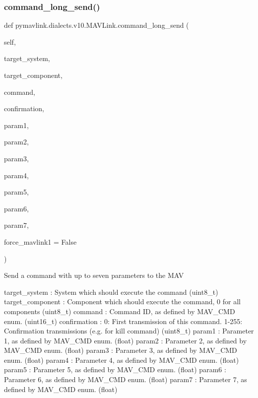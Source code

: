 \begin{DoxyVerb}
\begin{DoxyVerb}
\subsubsection{\texorpdfstring{command\+\_\+long\+\_\+send()}{command\_long\_send()}}
{\footnotesize\ttfamily def pymavlink.\+dialects.\+v10.\+M\+A\+V\+Link.\+command\+\_\+long\+\_\+send (\begin{DoxyParamCaption}\item[{}]{self,  }\item[{}]{target\+\_\+system,  }\item[{}]{target\+\_\+component,  }\item[{}]{command,  }\item[{}]{confirmation,  }\item[{}]{param1,  }\item[{}]{param2,  }\item[{}]{param3,  }\item[{}]{param4,  }\item[{}]{param5,  }\item[{}]{param6,  }\item[{}]{param7,  }\item[{}]{force\+\_\+mavlink1 = {\ttfamily False} }\end{DoxyParamCaption})}

\begin{DoxyVerb}Send a command with up to seven parameters to the MAV

target_system             : System which should execute the command (uint8_t)
target_component          : Component which should execute the command, 0 for all components (uint8_t)
command                   : Command ID, as defined by MAV_CMD enum. (uint16_t)
confirmation              : 0: First transmission of this command. 1-255: Confirmation transmissions (e.g. for kill command) (uint8_t)
param1                    : Parameter 1, as defined by MAV_CMD enum. (float)
param2                    : Parameter 2, as defined by MAV_CMD enum. (float)
param3                    : Parameter 3, as defined by MAV_CMD enum. (float)
param4                    : Parameter 4, as defined by MAV_CMD enum. (float)
param5                    : Parameter 5, as defined by MAV_CMD enum. (float)
param6                    : Parameter 6, as defined by MAV_CMD enum. (float)
param7                    : Parameter 7, as defined by MAV_CMD enum. (float)\end{DoxyVerb}
 \mbox{\label{classpymavlink_1_1dialects_1_1v10_1_1MAVLink_ac074be31dc0b284a7f109ad5f428b8c4}} 

\end{DoxyVerb}
\end{DoxyVerb}
